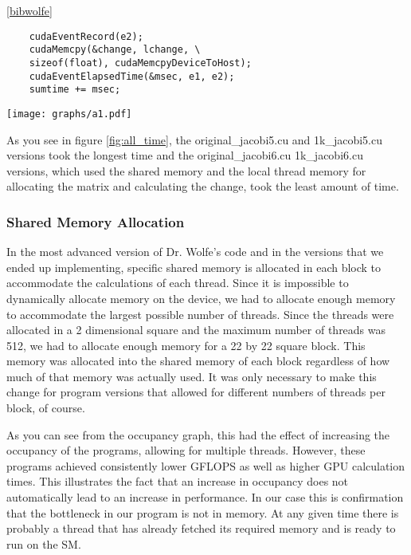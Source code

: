 \documentclass[10pt]{article}
\makeatletter
\newenvironment{figurehere}
{\def\@captype{figure}}
{}
\makeatother
\begin{document}
\begin{multicols}{2}
  \ref{bibwolfe}
  \begin{verbatim}
    cudaEventRecord(e2);
    cudaMemcpy(&change, lchange, \
    sizeof(float), cudaMemcpyDeviceToHost);
    cudaEventElapsedTime(&msec, e1, e2);
    sumtime += msec;
  \end{verbatim}

  \begin{figurehere}
    \centering
    \texttt{[image: graphs/a1.pdf]}
    \caption{}
    \label{fig:all_time}
  \end{figurehere}

  As you see in figure \ref{fig:all_time}, the original_jacobi5.cu and 1k_jacobi5.cu versions took the longest time and the original_jacobi6.cu 1k_jacobi6.cu versions, which used the shared memory and the local thread memory for allocating the matrix and calculating the change, took the least amount of time.

  \subsubsection{Shared Memory Allocation}%
  In the most advanced version of Dr. Wolfe's code and in the versions that we ended up implementing, specific shared memory is allocated in each block to accommodate the calculations of each thread.
  Since it is impossible to dynamically allocate memory on the device, we had to allocate enough memory to accommodate the largest possible number of threads.
  Since the threads were allocated in a 2 dimensional square and the maximum number of threads was 512, we had to allocate enough memory for a 22 by 22 square block.
  This memory was allocated into the shared memory of each block regardless of how much of that memory was actually used.
  It was only necessary to make this change for program versions that allowed for different numbers of threads per block, of course.

  As you can see from the occupancy graph, this had the effect of increasing the occupancy of the programs, allowing for multiple threads.
  However, these programs achieved consistently lower GFLOPS as well as higher GPU calculation times.
  This illustrates the fact that an increase in occupancy does not automatically lead to an increase in performance.
  In our case this is confirmation that the bottleneck in our program is not in memory.
  At any given time there is probably a thread that has already fetched its required memory and is ready to run on the SM.


\end{multicols}
\end{document}
